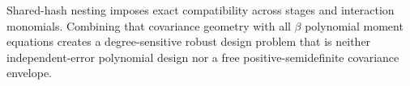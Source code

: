 Shared-hash nesting imposes exact compatibility across stages and interaction monomials.  Combining that covariance geometry with all \(\beta\) polynomial moment equations creates a degree-sensitive robust design problem that is neither independent-error polynomial design nor a free positive-semidefinite covariance envelope.